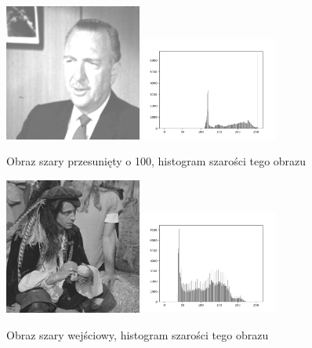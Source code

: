 \documentclass[final,a4paper,openany,12pt]{mwbk}
\begin{document}
\begin{figure}[H]
	\begin{center}
		\includegraphics[width=0.4\textwidth]{gentelman_gray_moveHist_result}
		\includegraphics[width=0.4\textwidth]{gentelman_gray_moveHist_histogram}
	\end{center}
	\caption{Obraz szary przesunięty o 100, histogram szarości tego obrazu}
\end{figure}

\begin{figure}[t]
	\begin{center}
		\includegraphics[width=0.4\textwidth]{pirate_gray}
		\includegraphics[width=0.4\textwidth]{pirate_gray_histogram}
	\end{center}
	\caption{Obraz szary wejściowy, histogram szarości tego obrazu}
\end{figure}
\end{document}
